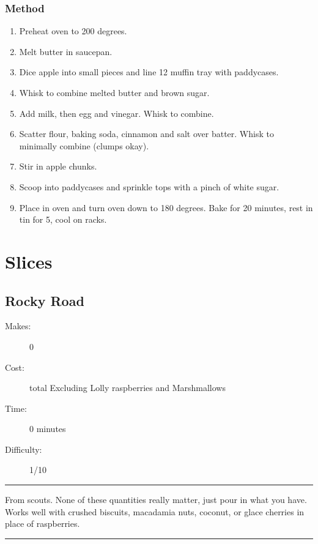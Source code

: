 \documentclass[]{article}
\begin{document}
\subsubsection*{\Large Method}
\begin{enumerate}[font=\huge\color{accent}]
	\item Preheat oven to 200 degrees.
	\item Melt butter in saucepan.
	\item Dice apple into small pieces and line 12 muffin tray with paddycases.
	\item Whisk to combine melted butter and brown sugar.
	\item Add milk, then egg and vinegar. Whisk to combine.
	\item Scatter flour, baking soda, cinnamon and salt over batter. Whisk to minimally combine (clumps okay).
	\item Stir in apple chunks.
	\item Scoop into paddycases and sprinkle tops with a pinch of white sugar.
	\item Place in oven and turn oven down to 180 degrees. Bake for 20 minutes, rest in tin for 5, cool on racks.
\end{enumerate}
\newpage
{}
\section*{\center\Huge\color{accent}Slices}
\label{cat:Slices}
\label{rec:Rocky Road}
\subsection*{\center\huge Rocky Road}
\begin{description}
\item[Makes:] 0 
\item[Cost:]  total Excluding Lolly raspberries and Marshmallows
\item[Time:] 0 minutes
\item[Difficulty:] 1/10
\end{description}
\vspace{0.2cm}\hrule\vspace{0.5cm}
\begin{adjustwidth}{0.5 cm}{0.5 cm}

From scouts. None of these quantities really matter, just pour in what you have. Works well with crushed biscuits, macadamia nuts, coconut, or glace cherries in place of raspberries. \hfill\color{accent}{\Large\faVimeoSquare\hspace{0.1cm}\faGlide\hspace{0.1cm}\faTruck\hspace{0.1cm}}\color{black}

\end{adjustwidth}
\vspace{0.5cm}\hrule
\end{document}
